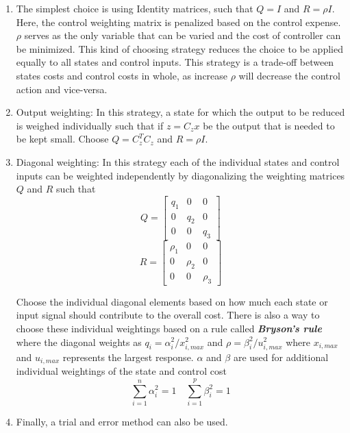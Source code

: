 \begin{enumerate}
	\item The simplest choice is using Identity matrices, such that $Q = I$ and $R = \rho I$. Here, the control weighting matrix is penalized based on the control expense. $\rho$ serves as the only variable that can be varied and the cost of controller can be minimized. This kind of choosing strategy reduces the choice to be applied equally to all states and control inputs. This strategy is a trade-off between states costs and control costs in whole, as increase $\rho$ will decrease the control action and vice-versa.
	\item Output weighting: In this strategy, a state for which the output to be reduced is weighed individually such that if $z = C_{z}x$ be the output that is needed to be kept small. Choose $Q = C_{z}^{T}C_{z}$ and $R = \rho I$.
	\item Diagonal weighting: In this strategy each of the individual states and control inputs can be weighted independently by diagonalizing the weighting matrices $Q$ and $R$ such that
	$$ Q = \begin{bmatrix} q_{1} & 0 & 0 \\ 0 & q_{2} & 0\\ 0 & 0 & q_{3} \end{bmatrix} $$
	$$ R = \begin{bmatrix} \rho_{1} & 0 & 0 \\ 0 & \rho_{2} & 0\\ 0 & 0 & \rho_{3} \end{bmatrix} $$
	
	Choose the individual diagonal elements based on how much each state or input signal should contribute to the overall cost. There is also a way to choose these individual weightings based on a rule called \textbf{\textit{Bryson's rule}} where the diagonal weights as $q_i = \alpha_{i}^{2} / x_{i,max}^{2}$ and $\rho = \beta_{i}^{2} / u_{i,max}^{2}$ where $x_{i,max}$ and $u_{i,max}$ represents the largest response. $\alpha$ and $\beta$ are used for additional individual weightings of the state and control cost
	$$ \sum_{i = 1}^{n} \alpha_{i}^{2} = 1 \quad \sum_{i = 1}^{p} \beta_{i}^{2} = 1 $$
	
	\item Finally, a trial and error method can also be used.
\end{enumerate}